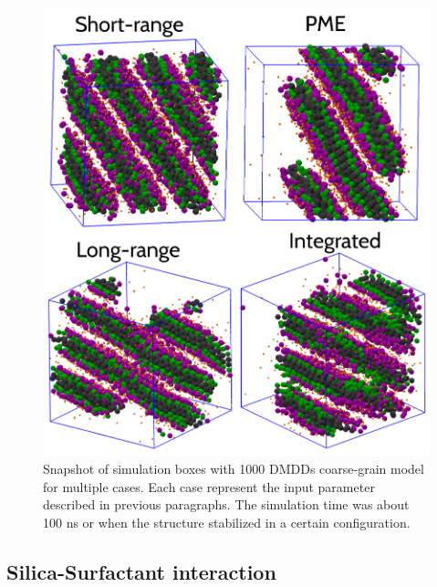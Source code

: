 \documentclass[10pt,a4paper,twoside]{article}
\begin{document}
\begin{figure}[H]
  \begin{center}
	\includegraphics[width=1 \textwidth]{./images/boxes1000}
	\caption{Snapshot of simulation boxes with 1000 DMDDs coarse-grain model for multiple cases. Each case represent the input parameter described in previous paragraphs. The simulation time was about 100 ns or when the structure stabilized in a certain configuration.}
	\label{Fig:b1000}
  \end{center}
\end{figure}
 
\subsection{Silica-Surfactant interaction}
\end{document}
